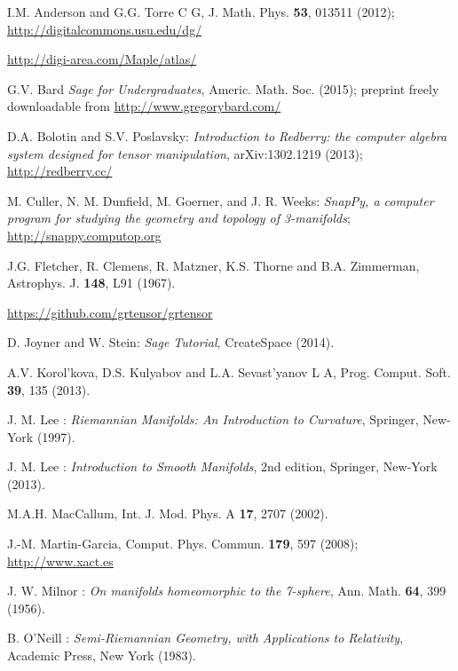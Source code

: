\begin{thebibliography}{123}

I.M. Anderson and G.G. Torre C G, J. Math. Phys. {\bf 53}, 013511 (2012);\\
\url{http://digitalcommons.usu.edu/dg/}

\url{http://digi-area.com/Maple/atlas/}

G.V. Bard {\it Sage for Undergraduates}, Americ. Math. Soc. (2015);
preprint freely downloadable from \url{http://www.gregorybard.com/}

D.A. Bolotin and S.V. Poslavsky: \emph{Introduction to Redberry: the computer algebra system designed for tensor manipulation}, arXiv:1302.1219 (2013);\\
\url{http://redberry.cc/}

M. Culler, N. M. Dunfield, M. Goerner, and J. R. Weeks: {\em SnapPy, a computer program for studying the geometry and topology of 3-manifolds};\\
\url{http://snappy.computop.org}

J.G. Fletcher, R. Clemens, R. Matzner, K.S. Thorne and B.A. Zimmerman,
Astrophys. J. {\bf 148}, L91 (1967).

\url{https://github.com/grtensor/grtensor}

D. Joyner and W. Stein: {\it Sage Tutorial}, CreateSpace (2014).

A.V. Korol'kova, D.S. Kulyabov and L.A. Sevast'yanov L A, Prog. Comput. Soft.
{\bf 39}, 135 (2013).

J. M. Lee : {\em Riemannian Manifolds: An Introduction to Curvature},
Springer, New-York (1997).

J. M. Lee : {\em Introduction to Smooth Manifolds}, 2nd edition,
Springer, New-York (2013).

M.A.H. MacCallum, Int. J. Mod. Phys. A {\bf 17}, 2707 (2002).

J.-M. Martin-Garcia, Comput. Phys. Commun. {\bf 179}, 597 (2008);\\
\url{http://www.xact.es}

J. W. Milnor : {\em On manifolds homeomorphic to the 7-sphere},
Ann. Math. {\bf 64}, 399 (1956).

B. O'Neill : {\em Semi-Riemannian Geometry, with Applications to Relativity},
Academic Press, New York (1983).


\end{thebibliography}
